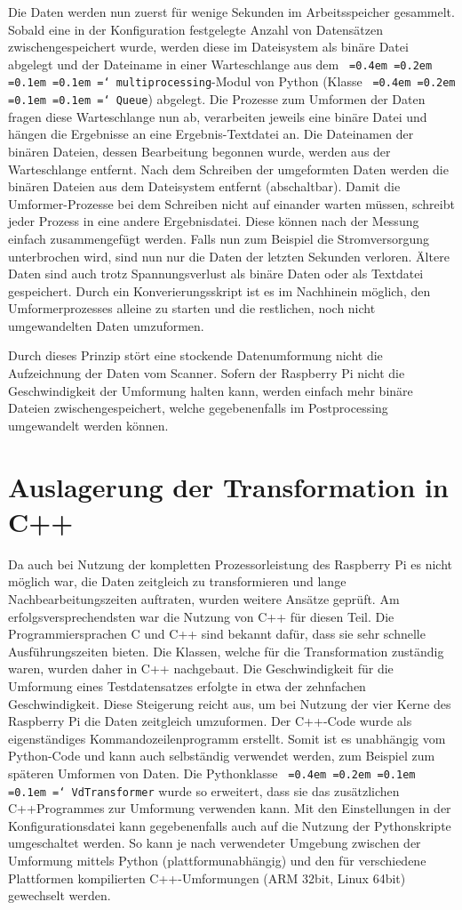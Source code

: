 \documentclass[a4paper,12pt,bibliography=totoc, listof=totoc,titlepage,pointlessnumbers]{scrreprt}
\newcommand*\justify{%
  \fontdimen2\font=0.4em%
  \fontdimen3\font=0.2em%
  \fontdimen4\font=0.1em%
  \fontdimen7\font=0.1em%
  \hyphenchar\font=`\-%
}
\newcommand{\code}[1]{\texttt{\justify{#1}}}
\begin{document}
Die Daten werden nun zuerst für wenige Sekunden im Arbeitsspeicher gesammelt. Sobald eine in der Konfiguration festgelegte Anzahl von Datensätzen zwischengespeichert wurde, werden diese im Dateisystem als binäre Datei abgelegt und der Dateiname in einer Warteschlange aus dem \code{multiprocessing}-Modul von Python (Klasse \code{Queue}) abgelegt. Die Prozesse zum Umformen der Daten fragen diese Warteschlange nun ab, verarbeiten jeweils eine binäre Datei und hängen die Ergebnisse an eine Ergebnis-Textdatei an. Die Dateinamen der binären Dateien, dessen Bearbeitung begonnen wurde, werden aus der Warteschlange entfernt. Nach dem Schreiben der umgeformten Daten werden die binären Dateien aus dem Dateisystem entfernt (abschaltbar). Damit die Umformer-Prozesse bei dem Schreiben nicht auf einander warten müssen, schreibt jeder Prozess in eine andere Ergebnisdatei. Diese können nach der Messung einfach zusammengefügt werden. Falls nun zum Beispiel die Stromversorgung unterbrochen wird, sind nun nur die Daten der letzten Sekunden verloren. Ältere Daten sind auch trotz Spannungsverlust als binäre Daten oder als Textdatei gespeichert. Durch ein Konverierungsskript ist es im Nachhinein möglich, den Umformerprozesses alleine zu starten und die restlichen, noch nicht umgewandelten Daten umzuformen.

Durch dieses Prinzip stört eine stockende Datenumformung nicht die Aufzeichnung der Daten vom Scanner. Sofern der Rasp\-berry Pi nicht die Geschwindigkeit der Umformung halten kann, werden einfach mehr binäre Dateien zwischengespeichert, welche gegebenenfalls im Postprocessing umgewandelt werden können.

\section{Auslagerung der Transformation in C++}
Da auch bei Nutzung der kompletten Prozessorleistung des Rasp\-berry Pi es nicht möglich war, die Daten zeitgleich zu transformieren und lange Nachbearbeitungszeiten auftraten, wurden weitere Ansätze geprüft. Am erfolgsversprechendsten war die Nutzung von C++ für diesen Teil. Die Programmiersprachen C und C++ sind bekannt dafür, dass sie sehr schnelle Ausführungszeiten bieten. Die Klassen, welche für die Transformation zuständig waren, wurden daher in C++ nachgebaut. Die Geschwindigkeit für die Umformung eines Testdatensatzes erfolgte in etwa der zehnfachen Geschwindigkeit. Diese Steigerung reicht aus, um bei Nutzung der vier Kerne des Rasp\-berry Pi die Daten zeitgleich umzuformen. Der C++-Code wurde als eigenständiges Kommandozeilenprogramm erstellt. Somit ist es unabhängig vom Python-Code und kann auch selbständig verwendet werden, zum Beispiel zum späteren Umformen von Daten.
Die Pythonklasse \code{VdTransformer} wurde so erweitert, dass sie das zusätzlichen C++Programmes zur Umformung verwenden kann. Mit den Einstellungen in der Konfigurationsdatei kann gegebenenfalls auch auf die Nutzung der Pythonskripte umgeschaltet werden. So kann je nach verwendeter Umgebung zwischen der Umformung mittels Python (plattformunabhängig) und den für verschiedene Plattformen kompilierten C++-Umformungen (ARM 32bit, Linux 64bit) gewechselt werden.
\end{document}
